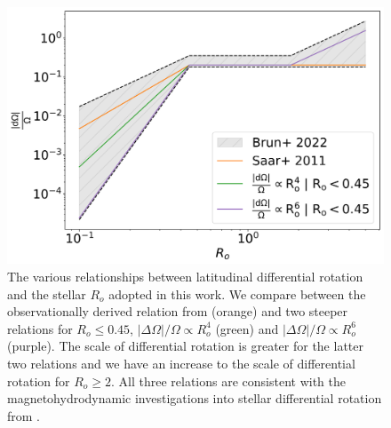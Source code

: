 \begin{figure}
\centering
  \includegraphics[width=\textwidth]{Figures/rot_gap_figures/comparison_diffrot.png}
  \caption[The various relationships between latitudinal differential rotation and the stellar $R_o$ adopted in this work.]{
  	The various relationships between latitudinal differential rotation and the stellar $R_o$ adopted in this work. We compare between the observationally derived relation from \citet{saar_starspots_2011} (orange) and two steeper relations for $R_o\leq0.45$, $|\Delta \Omega|/\Omega \propto R_o^4$ (green) and $|\Delta \Omega|/\Omega \propto R_o^6$ (purple). The scale of differential rotation is greater for the latter two relations and we have an increase to the scale of differential rotation for $R_o\geq2$. All three relations are consistent with the magnetohydrodynamic investigations into stellar differential rotation from \citet{brun_powering_2022}.
}
  \label{fig:compar_diffrot}
\end{figure}

